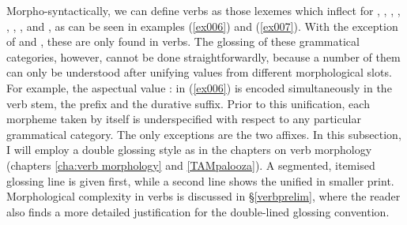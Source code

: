 Morpho-syntactically, we can define verbs as those lexemes which inflect for , , , , , , , and , as can be seen in examples (\ref{ex006}) and (\ref{ex007}). With the exception of  and , these are only found in verbs. The glossing of these grammatical categories, however, cannot be done straightforwardly, because a number of them can only be understood after unifying values from different morphological slots. For example, the aspectual value \Pst:\Dur{} in (\ref{ex006}) is encoded simultaneously in the verb stem, the prefix and the durative suffix. Prior to this unification, each morpheme taken by itself is underspecified with respect to any particular grammatical category. The only exceptions are the two  affixes. In this subsection, I will employ a double glossing style as in the chapters on verb morphology (chapters \ref{cha:verb morphology} and \ref{TAMpalooza}). A segmented, itemised glossing line is given first, while a second line shows the unified  in smaller print. Morphological complexity in verbs is discussed in {\S}\ref{verbprelim}, where the reader also finds a more detailed justification for the double-lined glossing convention.

